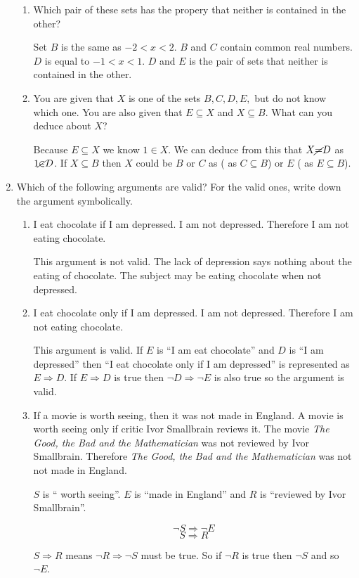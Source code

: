 \documentclass{article}
\begin{document}
\begin{enumerate}
\begin{enumerate}
			\item Which pair of these sets has the propery that neither is contained in the other?
			
				Set $B$ is the same as $-2 < x < 2$. $B$ and $C$ contain common real numbers. 
				$D$ is equal to $-1 < x < 1$. $D$ and $E$ is the pair of sets that neither is contained
				in the other.
				
			\item You are given that $X$ is one of the sets $B, C,  D, E,$ but do not know which one.
				You are also given that $E \subseteq  X$ and $X \subseteq B$. What can you deduce
				about $X$?
				
				Because $E \subseteq X$ we know $1 \in X$. We can deduce from this that $X \cancel{=} D$ as
				$1 \cancel{\in} D$. If $X \subseteq B$ then $X$ could be $B$ or $C$ as ( as $C \subseteq B$) or
				$E$ ( as $E \subseteq B$).
		\end{enumerate}
		
		\item Which of the following arguments are valid? For the valid ones, write down the argument symbolically.
		
		\begin{enumerate}
		
			\item I eat chocolate if I am depressed. I am not depressed. Therefore I am not eating chocolate.
			
				This argument is not valid. The lack of depression says nothing about the eating of chocolate.
				The subject may be eating chocolate when not depressed.
				
			\item I eat chocolate only if I am depressed. I am not depressed. Therefore I am not eating chocolate.
			
				This argument is valid. If $E$ is ``I am eat chocolate'' and $D$ is ``I am depressed'' then 
				``I eat chocolate only if I am depressed'' is represented as $E \Rightarrow D$. If $E \Rightarrow D$
				is true then $\neg D \Rightarrow \neg E$ is also true so the argument is valid.
				
			\item If a movie is worth seeing, then it was not made in England. A movie is worth seeing only if critic
				Ivor Smallbrain reviews it. The movie \emph{The Good, the Bad and the Mathematician} was not
				reviewed by Ivor Smallbrain. Therefore \emph{The Good, the Bad and the Mathematician} was not
				not made in England.
				
				$S$ is `` worth seeing''. $E$ is ``made in England'' and $R$ is ``reviewed by Ivor Smallbrain''.
				
				$$\neg S \Rightarrow \neg E$$
				$$S \Rightarrow R$$
				
				$S \Rightarrow R$ means $\neg R \Rightarrow \neg S$ must be true. So if $\neg R$ is true then $\neg S$
				and so $\neg E$.
		\end{enumerate}
	\end{enumerate}
\end{document}
